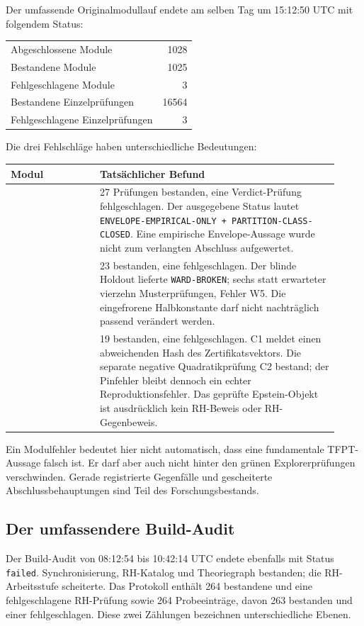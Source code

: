 Der umfassende Originalmodullauf endete am selben Tag um 15:12:50 UTC mit folgendem Status:
\begin{center}
\begin{tabular}{lr}
\toprule
Abgeschlossene Module & 1028\\
Bestandene Module & 1025\\
Fehlgeschlagene Module & 3\\
Bestandene Einzelprüfungen & 16564\\
Fehlgeschlagene Einzelprüfungen & 3\\\bottomrule
\end{tabular}
\end{center}
Die drei Fehlschläge haben unterschiedliche Bedeutungen:
\begin{longtable}{L{0.25\linewidth}L{0.67\linewidth}}
\toprule
Modul & Tatsächlicher Befund\\\midrule\endhead
{} & 27 Prüfungen bestanden, eine Verdict-Prüfung fehlgeschlagen. Der ausgegebene Status lautet \texttt{ENVELOPE-EMPIRICAL-ONLY + PARTITION-CLASS-CLOSED}. Eine empirische Envelope-Aussage wurde nicht zum verlangten Abschluss aufgewertet.\\
 & 23 bestanden, eine fehlgeschlagen. Der blinde Holdout lieferte \texttt{WARD-BROKEN}; sechs statt erwarteter vierzehn Musterprüfungen, Fehler W5. Die eingefrorene Halbkonstante darf nicht nachträglich passend verändert werden.\\
 & 19 bestanden, eine fehlgeschlagen. C1 meldet einen abweichenden Hash des Zertifikatsvektors. Die separate negative Quadratikprüfung C2 bestand; der Pinfehler bleibt dennoch ein echter Reproduktionsfehler. Das geprüfte Epstein-Objekt ist ausdrücklich kein RH-Beweis oder RH-Gegenbeweis.\\\bottomrule
\end{longtable}

Ein Modulfehler bedeutet hier nicht automatisch, dass eine fundamentale TFPT-Aussage falsch ist. Er darf aber auch nicht hinter den grünen Explorerprüfungen verschwinden. Gerade registrierte Gegenfälle und gescheiterte Abschlussbehauptungen sind Teil des Forschungsbestands.

\subsection{Der umfassendere Build-Audit}
Der Build-Audit von 08:12:54 bis 10:42:14 UTC endete ebenfalls mit Status \texttt{failed}. Synchronisierung, RH-Katalog und Theoriegraph bestanden; die RH-Arbeitsstufe scheiterte. Das Protokoll enthält 264 bestandene und eine fehlgeschlagene RH-Prüfung sowie 264 Probeeinträge, davon 263 bestanden und einer fehlgeschlagen. Diese zwei Zählungen bezeichnen unterschiedliche Ebenen.


